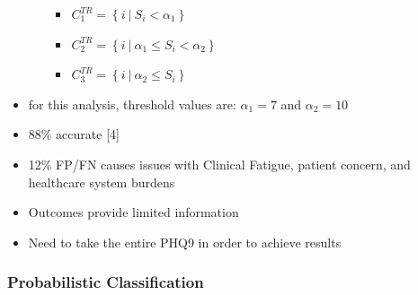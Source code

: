 \documentclass[12pt,]{article}
\providecommand{\tightlist}{%
  \setlength{\itemsep}{0pt}\setlength{\parskip}{0pt}}
\begin{document}
\begin{itemize}
\begin{itemize}
    \begin{itemize}
    \tightlist
    \item
      \(C_{1}^{TR}=\left \{i \ \Big | \ S_{i} < \alpha_{1} \right \}\)
    \item
      \(C_{2}^{TR}=\left \{i \ \Big | \ \alpha_{1} \leq S_{i} < \alpha_{2} \right \}\)
    \item
      \(C_{3}^{TR}=\left \{i \ \Big | \ \alpha_{2} \leq S_{i} \right \}\)
    \end{itemize}
  \end{itemize}
\item
  for this analysis, threshold values are: \(\alpha_{1}=7\) and
  \(\alpha_{2}=10\)
\item
  88\% accurate {[}4{]}
\item
  12\% FP/FN causes issues with Clinical Fatigue, patient concern, and
  healthcare system burdens
\item
  Outcomes provide limited information
\item
  Need to take the entire PHQ9 in order to achieve results
\end{itemize}

\hypertarget{probabilistic-classification}{%
\subsubsection{Probabilistic
Classification}\label{probabilistic-classification}}
\end{document}
